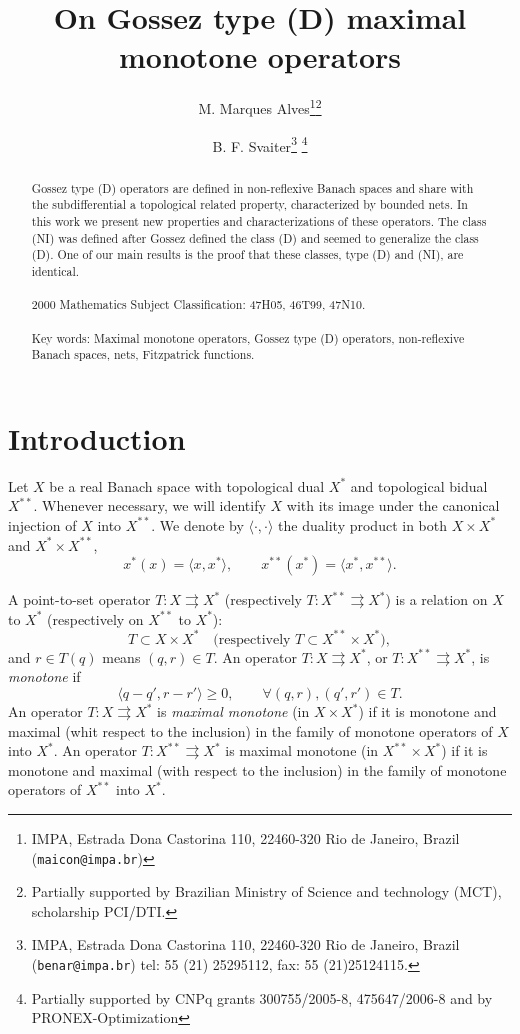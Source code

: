 \documentclass[11pt]{article}
\title{On Gossez type (D) maximal monotone operators}
\author{M. Marques Alves\thanks{IMPA, Estrada Dona Castorina 110, 22460-320
    Rio de Janeiro, Brazil
   ({\tt maicon@impa.br})}\hspace{.5em}\thanks{Partially supported by Brazilian Ministry of Science and
    technology (MCT), scholarship PCI/DTI.}
  \and
    B. F. Svaiter\thanks{ IMPA, Estrada Dona Castorina 110, 22460-320 Rio de
    Janeiro, Brazil ({\tt benar@impa.br}) 
    tel: 55 (21) 25295112, fax: 55 (21)25124115.  }\hspace{.5em}
    \thanks{Partially supported by CNPq
    grants 300755/2005-8, 475647/2006-8 and by PRONEX-Optimization}
}
\date{}
\newcommand{\inner}[2]{\langle{#1},{#2}\rangle}
\newcommand{\tos}{\rightrightarrows} %
\begin{document}
\maketitle

\begin{abstract}
  Gossez type (D) operators are defined in non-reflexive Banach spaces
  and share with the subdifferential a topological related property,
  characterized by bounded nets.
  In this work we present new properties and characterizations of
  these operators.
  The class (NI) was defined after Gossez defined the class (D) and
  seemed to generalize the class (D).
  One of our main results is the proof that these classes, type (D) and
  (NI), are identical.
  \\
  \\
  2000 Mathematics Subject Classification: 47H05, 46T99, 47N10.
  \\
  \\
  Key words: Maximal monotone operators, 
   Gossez type (D) operators,
   non-reflexive Banach spaces, nets, Fitzpatrick
  functions.
  \\
%
\end{abstract}

\pagestyle{plain}


\section{Introduction}

Let $X$ be a real Banach space with topological dual $X^*$ and
topological bidual $X^{**}$. 
%
Whenever necessary, we will identify $X$ with its image under the
canonical injection of $X$ into $X^{**}$.
%
We denote by $\inner{\cdot}{\cdot}$ the
duality product in both $X\times X^*$ and $X^*\times X^{**}$,
\[
x^*(x)=\inner{x}{x^*},\qquad x^{**}(x^*)=\inner{x^*}{x^{**}}.
\]

A  point-to-set operator $T:X\tos X^*$ 
(respectively $T:X^{**}\tos X^{*}$)
 is a relation on $X$ to
$X^*$ 
(respectively on $X^{**}$ to $X^{*}$):
\[ 
 T\subset X\times X^* \quad\mbox{(respectively } T\subset
X^{**}\times X^*),
\]
and $r\in T(q)$ means $(q,r)\in T$.
An operator $T:X\tos X^*$, or $T:X^{**}\tos X^*$, is {\it monotone} if
\[
\inner{q-q'}{r-r'}\geq 0,\qquad \forall (q,r),(q',r')\in T.
\]
An operator $T:X\tos X^*$ is {\it maximal monotone} (in $X\times X^*$) if it
is monotone and maximal (whit respect to the inclusion) in the family
of monotone operators of $X$ into $X^*$.
An operator $T:X^{**}\tos X^*$ is maximal monotone (in $X^{**}\times
X^*$) if it is monotone and maximal (with respect to the inclusion) in
the family of monotone operators of $X^{**}$ into $X^*$.
\end{document}
